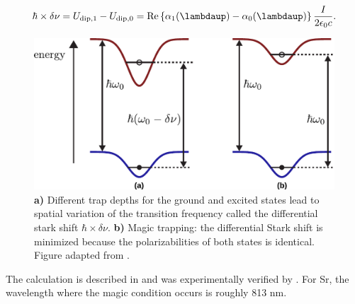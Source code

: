 \begin{equation}\label{eq:DifferentialStarkShift}
    \hbar \times \delta \nu = U_{\text{dip},1} - U_{\text{dip},0} = 
    \operatorname{Re}\left\{\alpha_1(\lambdaup)-\alpha_0(\lambdaup)\right\} \frac{I}{2 \epsilon_0 c}.
\end{equation}
\begin{figure}
    \centering
    \includegraphics[width=0.68\linewidth]{figures/MagicTrapping.pdf}
    \caption{\textsf{\textbf{a)}} Different trap depths for the ground and excited states lead to spatial variation of the transition frequency called the differential stark shift $\hbar \times \delta \nu$.
    \textsf{\textbf{b)}} Magic trapping: the differential Stark shift is minimized because the polarizabilities of both states is identical.
    Figure adapted from \cite{Lundblad2010}.}
    \label{fig:MagicTrapping}
\end{figure}

The calculation is described in \cite{Madjarov2020,Boyd2007} and was experimentally verified by \cite{Takamoto2005}.
For Sr, the wavelength where the magic condition occurs is roughly 813 nm. 






	

